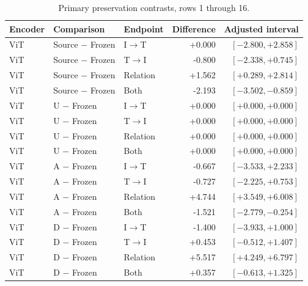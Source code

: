 \begin{table}[t]
\centering
\small
\setlength{\tabcolsep}{3pt}
\begin{tabular}{lllrr}
\toprule
Encoder & Comparison & Endpoint & Difference & Adjusted interval\\
\midrule
ViT & Source $-$ Frozen & I$\to$T & +0.000 & $[-2.800,+2.858]$ \\
ViT & Source $-$ Frozen & T$\to$I & -0.800 & $[-2.338,+0.745]$ \\
ViT & Source $-$ Frozen & Relation & +1.562 & $[+0.289,+2.814]$ \\
ViT & Source $-$ Frozen & Both & -2.193 & $[-3.502,-0.859]$ \\
ViT & U $-$ Frozen & I$\to$T & +0.000 & $[+0.000,+0.000]$ \\
ViT & U $-$ Frozen & T$\to$I & +0.000 & $[+0.000,+0.000]$ \\
ViT & U $-$ Frozen & Relation & +0.000 & $[+0.000,+0.000]$ \\
ViT & U $-$ Frozen & Both & +0.000 & $[+0.000,+0.000]$ \\
ViT & A $-$ Frozen & I$\to$T & -0.667 & $[-3.533,+2.233]$ \\
ViT & A $-$ Frozen & T$\to$I & -0.727 & $[-2.225,+0.753]$ \\
ViT & A $-$ Frozen & Relation & +4.744 & $[+3.549,+6.008]$ \\
ViT & A $-$ Frozen & Both & -1.521 & $[-2.779,-0.254]$ \\
ViT & D $-$ Frozen & I$\to$T & -1.400 & $[-3.933,+1.000]$ \\
ViT & D $-$ Frozen & T$\to$I & +0.453 & $[-0.512,+1.407]$ \\
ViT & D $-$ Frozen & Relation & +5.517 & $[+4.249,+6.797]$ \\
ViT & D $-$ Frozen & Both & +0.357 & $[-0.613,+1.325]$ \\
\bottomrule
\end{tabular}
\caption{Primary preservation contrasts, rows 1 through 16.}\label{tab:adprimary0}
\end{table}


